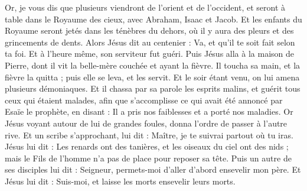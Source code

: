 \begin{multicols}{2}
Or, je vous dis que plusieurs viendront de l’orient et de l’occident, et seront à table dans le Royaume des cieux, avec Abraham, Isaac et Jacob.
Et les enfants du Royaume seront jetés dans les ténèbres du dehors, où il y aura des pleurs et des grincements de dents.
Alors Jésus dit au centenier : Va, et qu'il te soit fait selon ta foi. Et à l'heure même, son serviteur fut guéri.
Puis Jésus alla à la maison de Pierre, dont il vit la belle-mère couchée et ayant la fièvre.
Il toucha sa main, et la fièvre la quitta ; puis elle se leva, et les servit.
Et le soir étant venu, on lui amena plusieurs démoniaques. Et il chassa par sa parole les esprits malins, et guérit tous ceux qui étaient malades,
afin que s’accomplisse ce qui avait été annoncé par Esaïe le prophète, en disant : Il a pris nos faiblesses et a porté nos maladies{}.
Or Jésus voyant autour de lui de grandes foules, donna l’ordre de passer à l'autre rive.
Et un scribe s'approchant, lui dit : Maître, je te suivrai partout où tu iras.
Jésus lui dit : Les renards ont des tanières, et les oiseaux du ciel ont des nids ; mais le Fils de l'homme n'a pas de place pour reposer sa tête.
Puis un autre de ses disciples lui dit : Seigneur, permets-moi d'aller d’abord ensevelir mon père.
Et Jésus lui dit : Suis-moi, et laisse les morts ensevelir leurs morts.
\end{multicols}
